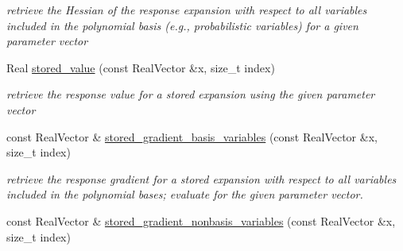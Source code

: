 \begin{DoxyCompactItemize}
\begin{DoxyCompactList}\small\item\em retrieve the Hessian of the response expansion with respect to all variables included in the polynomial basis (e.\+g., probabilistic variables) for a given parameter vector \end{DoxyCompactList}\item 
Real \hyperlink{classPecos_1_1OrthogPolyApproximation_a1abe918dbdc66ac0fde85f1ab3c061af}{stored\+\_\+value} (const Real\+Vector \&x, size\+\_\+t index)\label{classPecos_1_1OrthogPolyApproximation_a1abe918dbdc66ac0fde85f1ab3c061af}

\begin{DoxyCompactList}\small\item\em retrieve the response value for a stored expansion using the given parameter vector \end{DoxyCompactList}\item 
const Real\+Vector \& \hyperlink{classPecos_1_1OrthogPolyApproximation_a7689fc058e2efdde6ce4dfe898864592}{stored\+\_\+gradient\+\_\+basis\+\_\+variables} (const Real\+Vector \&x, size\+\_\+t index)\label{classPecos_1_1OrthogPolyApproximation_a7689fc058e2efdde6ce4dfe898864592}

\begin{DoxyCompactList}\small\item\em retrieve the response gradient for a stored expansion with respect to all variables included in the polynomial bases; evaluate for the given parameter vector. \end{DoxyCompactList}\item 
const Real\+Vector \& \hyperlink{classPecos_1_1OrthogPolyApproximation_af0c9184d9a0da7b0e3d0d3ecbfc8f434}{stored\+\_\+gradient\+\_\+nonbasis\+\_\+variables} (const Real\+Vector \&x, size\+\_\+t index)\label{classPecos_1_1OrthogPolyApproximation_af0c9184d9a0da7b0e3d0d3ecbfc8f434}


\end{DoxyCompactItemize}
